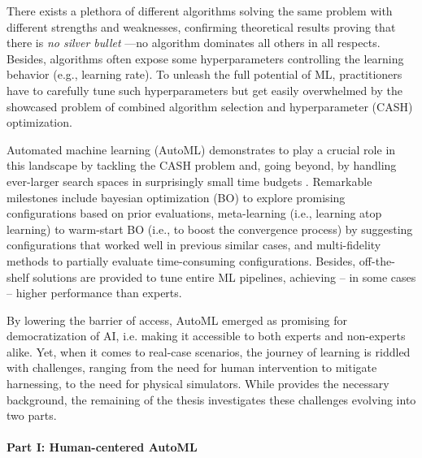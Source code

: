\documentclass[a4paper,12pt,times,numbered,print,index]{Classes/PhDThesisPSnPDF}
\begin{document}
There exists a plethora of different algorithms solving the same problem with different strengths and weaknesses, confirming theoretical results proving that there is \textit{no silver bullet} \cite{kerschke2019automated}---no algorithm dominates all others in all respects.
Besides, algorithms often expose some hyperparameters controlling the learning behavior (e.g., learning rate). 
To unleash the full potential of ML, practitioners have to carefully tune such hyperparameters but get easily overwhelmed by the showcased problem of combined algorithm selection and hyperparameter (CASH) optimization.

Automated machine learning (AutoML) demonstrates to play a crucial role in this landscape by tackling the CASH problem and, going beyond, by handling ever-larger search spaces in surprisingly small time budgets \cite{}.
Remarkable milestones include bayesian optimization (BO) to explore promising configurations based on prior evaluations,
meta-learning (i.e., learning atop learning) to warm-start BO (i.e., to boost the convergence process) by suggesting configurations that worked well in previous similar cases, and multi-fidelity methods to partially evaluate time-consuming configurations.
Besides, off-the-shelf solutions \cite{} are provided to tune entire ML pipelines, achieving -- in some cases -- higher performance than experts.

By lowering the barrier of access, AutoML emerged as promising for democratization of AI, i.e. making it accessible to both experts and non-experts alike.
Yet, when it comes to real-case scenarios, the journey of learning is riddled with challenges, ranging from the need for human intervention to mitigate harnessing, to the need for physical simulators.
While  provides the necessary background, the remaining of the thesis investigates these challenges evolving into two parts.




\paragraph{Part I: Human-centered AutoML}
\end{document}
